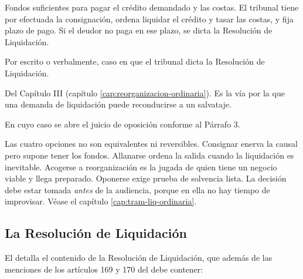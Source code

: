 \begin{description}[leftmargin=0pt,style=nextline,font=\sffamily\bfseries]
  \item[a) Consignar] Fondos suficientes para pagar el crédito demandado y las costas. El
  tribunal tiene por efectuada la consignación, ordena liquidar el crédito y tasar las
  costas, y fija plazo de pago. Si el deudor no paga en ese plazo, se dicta la Resolución de
  Liquidación.

  \item[b) Allanarse] Por escrito o verbalmente, caso en que el tribunal dicta la
  Resolución de Liquidación.

  \item[c) Acogerse a reorganización] Del Capítulo III (capítulo
  \ref{cap:reorganizacion-ordinaria}). Es la vía por la que una demanda de liquidación puede
  reconducirse a un salvataje.

  \item[d) Oponerse] En cuyo caso se abre el juicio de oposición conforme al Párrafo 3.
\end{description}

\begin{foco}
Las cuatro opciones no son equivalentes ni reversibles. Consignar enerva la causal pero
supone tener los fondos. Allanarse ordena la salida cuando la liquidación es inevitable.
Acogerse a reorganización es la jugada de quien tiene un negocio viable y llega preparado.
Oponerse exige prueba de solvencia lista. La decisión debe estar tomada \emph{antes} de la
audiencia, porque en ella no hay tiempo de improvisar. Véase el capítulo
\ref{cap:tram-liq-ordinaria}.
\end{foco}

\subsection{La Resolución de Liquidación}

El  detalla el contenido de la Resolución de Liquidación, que además de las
menciones de los artículos 169 y 170 del \cpc{} debe contener:

